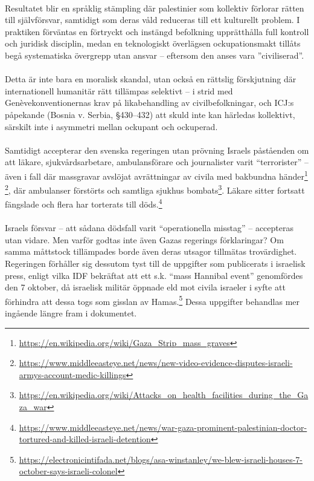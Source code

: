 \paragraph{}
Resultatet blir en språklig stämpling där palestinier som kollektiv förlorar rätten till självförsvar, samtidigt som deras våld reduceras till ett kulturellt problem. I praktiken förväntas en förtryckt och instängd befolkning upprätthålla full kontroll och juridisk disciplin, medan en teknologiskt överlägsen ockupationsmakt tillåts begå systematiska övergrepp utan ansvar – eftersom den anses vara ”civiliserad”.

\paragraph{}
Detta är inte bara en moralisk skandal, utan också en rättslig förskjutning där internationell humanitär rätt tillämpas selektivt – i strid med Genèvekonventionernas krav på likabehandling av civilbefolkningar, och ICJ:s påpekande (Bosnia v. Serbia, §430–432) att skuld inte kan härledas kollektivt, särskilt inte i asymmetri mellan ockupant och ockuperad.

\paragraph{}
Samtidigt accepterar den svenska regeringen utan prövning Israels påståenden om att läkare, sjukvårdsarbetare, ambulansförare och journalister varit \enquote{terrorister} – även i fall där massgravar avslöjat avrättningar av civila med bakbundna händer\footnote{\url{https://en.wikipedia.org/wiki/Gaza_Strip_mass_graves}} \footnote{\url{https://www.middleeasteye.net/news/new-video-evidence-disputes-israeli-armys-account-medic-killings}}, där ambulanser förstörts och samtliga sjukhus bombats\footnote{\url{https://en.wikipedia.org/wiki/Attacks_on_health_facilities_during_the_Gaza_war}}. Läkare sitter fortsatt fängslade och flera har torterats till döds.\footnote{\url{https://www.middleeasteye.net/news/war-gaza-prominent-palestinian-doctor-tortured-and-killed-israeli-detention}}

\paragraph{}
Israels försvar – att sådana dödsfall varit \enquote{operationella misstag} – accepteras utan vidare. Men varför godtas inte även Gazas regerings förklaringar? Om samma måttstock tillämpades borde även deras utsagor tillmätas trovärdighet.
Regeringen förhåller sig dessutom tyst till de uppgifter som publicerats i israelisk press, 
enligt vilka IDF bekräftat att ett s.k. \enquote{mass Hannibal event} genomfördes den 7 oktober, 
då israelisk militär öppnade eld mot civila israeler i syfte att förhindra att dessa togs som 
gisslan av Hamas.\footnote{\url{https://electronicintifada.net/blogs/asa-winstanley/we-blew-israeli-houses-7-october-says-israeli-colonel}} Dessa uppgifter behandlas mer ingående längre fram i dokumentet.

